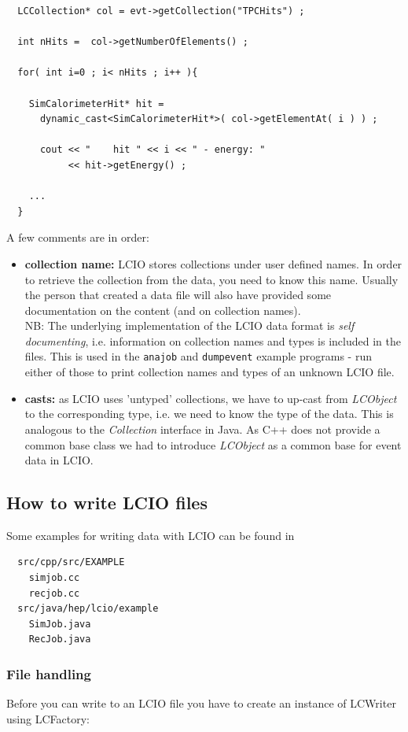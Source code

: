 \documentclass[twoside]{article}
\begin{document}
\begin{verbatim}
  LCCollection* col = evt->getCollection("TPCHits") ;

  int nHits =  col->getNumberOfElements() ;

  for( int i=0 ; i< nHits ; i++ ){

    SimCalorimeterHit* hit = 
      dynamic_cast<SimCalorimeterHit*>( col->getElementAt( i ) ) ;

      cout << "    hit " << i << " - energy: "  
           << hit->getEnergy() ;

    ...
  }
\end{verbatim}

A few comments are in order:
\begin{itemize}
\item{ {\bf collection name:} LCIO stores collections under user defined names. In order to retrieve 
the collection from the data, you need to know this name. Usually the person that created a data 
file will also have provided some documentation on the content (and on collection names). \\
NB: The underlying implementation of the LCIO data format is {\em self documenting}, i.e. information
on collection names and types is included in the files. This is used in the \verb$anajob$ and 
\verb$dumpevent$ example programs - run either of those to print collection names and 
types of an unknown LCIO file.
}

\item{ {\bf casts:} as LCIO uses 'untyped' collections, we have to up-cast from {\em LCObject} to 
the corresponding type, i.e. we need to know the type of the data. This is analogous to the 
{\em Collection} interface in Java. As C++ does not provide a common base class we had to 
introduce {\em LCObject} as a common base for event data in LCIO.
}

\end {itemize}


\subsection{How to write LCIO files}

Some examples for writing data with LCIO can be found in
\begin{verbatim}
  src/cpp/src/EXAMPLE
    simjob.cc
    recjob.cc
  src/java/hep/lcio/example
    SimJob.java
    RecJob.java
\end{verbatim}

\subsubsection{File handling}
Before you can write to an LCIO file you have to create an instance of LCWriter using LCFactory:
\end{document}
